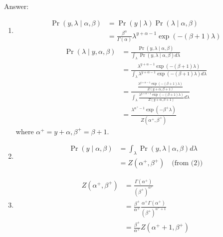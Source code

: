 \documentclass{article}
\def\ans#1{\par\gre{Answer: #1}}
\def\gre#1{{\color{gre}#1}}
\def\cond{\; | \;}
\def\enum#1{\begin{enumerate}#1\end{enumerate}}
\begin{document}
\ans{
\enum{
\item 
\begin{equation}
\begin{aligned}
    \Pr(y, \lambda \cond \alpha,\beta) 
    &= \Pr(y \cond \lambda)\Pr(\lambda \cond \alpha,\beta)\\
    &= \frac{\beta^\alpha}{\Gamma(\alpha)}\lambda^{y+\alpha-1}\exp(-(\beta+1)\lambda)
\end{aligned}
\end{equation}
\begin{equation}
\begin{aligned}
    \Pr(\lambda \cond y, \alpha, \beta)
    &= \frac{\Pr(y, \lambda \cond \alpha, \beta)}{\int_{\lambda} \Pr(y, \lambda \cond \alpha, \beta)d\lambda}\\
    &= \frac{\lambda^{y+\alpha-1}\exp(-(\beta+1)\lambda)}
    {\int_{\lambda} \lambda^{y+\alpha-1}\exp(-(\beta+1)\lambda)d\lambda}\\
    &= \frac{
        \frac{\lambda^{y+\alpha-1}\exp(-(\beta+1)\lambda)}
        {Z(y+\alpha,\beta+1)}
    }{
        \int_{\lambda}
        \frac{ \lambda^{y+\alpha-1}\exp(-(\beta+1)\lambda)}
        {Z(y+\alpha,\beta+1)}
        d\lambda
    }\\
    &= \frac{\lambda^{\alpha^+ -1}\exp(-\beta^+\lambda)}{Z(\alpha^+,\beta^+)}
\end{aligned}
\end{equation}
where $\alpha^+=y+\alpha, \beta^+=\beta+1$.
\item
\begin{equation}
\begin{aligned}
    \Pr(y \cond \alpha, \beta)
    &= \int_{\lambda} \Pr(y, \lambda \cond \alpha, \beta) d\lambda\\
    &= Z(\alpha^+,\beta^+) \quad\text{(from (2))}
\end{aligned}
\end{equation}
\item
\begin{equation}
\begin{aligned}
    Z(\alpha^+, \beta^+) 
    &= \frac{\Gamma(\alpha^+)}{(\beta^+)^{\alpha^+}}\\
    &= \frac{\beta^+}{\alpha^+}
    \frac{\alpha^+ \Gamma(\alpha^+)}{(\beta^+)^{\alpha^+ + 1}}\\
    &= \frac{\beta^+}{\alpha^+}Z(\alpha^+ + 1, \beta^+) 
\end{aligned}
\end{equation}
\begin{equation}

\end{equation}}}
\end{document}
